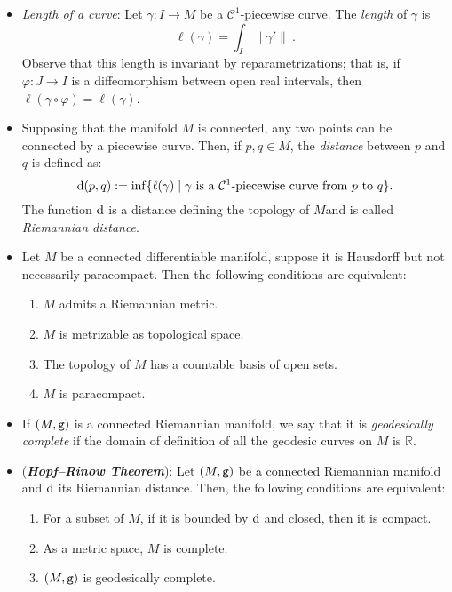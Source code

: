 \documentclass[12pt]{report}
\def\Real{\mathbb{R}}
\begin{document}
\begin{itemize}
  \item
  {\sl Length of a curve\/}: Let $\gamma\colon I\to M$ be a ${\mathcal C}^1$-piecewise curve. The \emph{length} of $\gamma$ is
  $$
  \ell(\gamma)=\int_I\parallel\gamma'\parallel\ .
  $$ 
  Observe that this length is invariant by reparametrizations;
  that is, if $\varphi\colon J\to I$ is a diffeomorphism 
  between open real intervals, then $\ell(\gamma\circ\varphi)=\ell(\gamma)$.
  \item
  Supposing that the manifold $M$ is connected, any two points can be connected by a piecewise curve. Then,
  if $p,q\in M$,  the {\sl distance} between $p$ and $q$ is defined as:
  $$
  {\rm d}(p,q):=\inf\{\ell(\gamma)\mid \gamma\textrm{ is a }{\mathcal C}^1\textrm{-piecewise curve from}\,\, p\,\, \textrm{to}\,\, q\}.
  $$
  The function $ {\rm d}$ is a distance defining the topology of $M$and is called {\sl Riemannian distance}.
  \item
  Let $M$ be a connected differentiable manifold, 
  suppose it is Hausdorff but not necessarily paracompact. 
  Then the following conditions are equivalent:
  \begin{enumerate}
  \item 
  $M$ admits a Riemannian metric.
  \item 
  $M$ is metrizable as topological space.
  \item 
  The topology of $M$ has a countable basis of open sets.
  \item 
  $M$ is paracompact.
\end{enumerate}
  \item
If $(M,{\tt g})$ is a connected Riemannian manifold,
we say that it is {\sl geodesically complete} 
if the domain of definition of all the geodesic curves on $M$ is $\Real$. 
  \item
({\sl \textbf{Hopf--Rinow Theorem\/}}): 
Let $(M,{\tt g})$ be a connected Riemannian manifold and ${\rm d}$ 
its Riemannian distance. Then, the following conditions are equivalent:
  \begin{enumerate} 
   \item 
For a subset of $M$, if it is bounded by ${\rm d}$ and closed,
then it is compact.
   \item 
As a metric space, $M$ is complete.
   \item 
$(M,{\tt g})$ is geodesically complete.
\end{enumerate}
\end{itemize}
\end{document}
